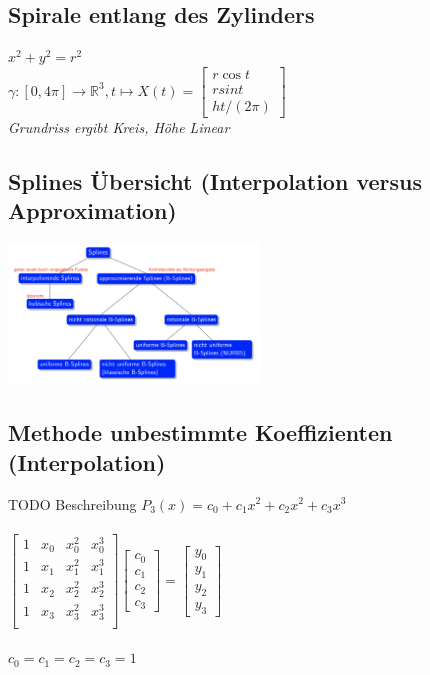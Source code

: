 \subsection{Spirale entlang des Zylinders}

$x^2 + y^2 = r^2$ \\
$\gamma : [0, 4\pi] \rightarrow \mathbb{R}^3, t \mapsto X(t) = \begin{bmatrix}
    r \cos t \\ r sin t \\ ht / (2\pi)
\end{bmatrix}$ \\
\textit{Grundriss ergibt Kreis, Höhe Linear}

\subsection{Splines Übersicht (Interpolation versus Approximation)}
\includegraphics[width=0.5\textwidth]{assets/InterpolationVSApproximation.png}


\subsection{Methode unbestimmte Koeffizienten (Interpolation)}
TODO Beschreibung
$P_3(x) = c_0 + c_1x^2 + c_2x^2 + c_3x^3$ \\
\\
$\begin{bmatrix}
    1 & x_0 & x_0^2 & x_0^3 \\
    1 & x_1 & x_1^2 & x_1^3 \\
    1 & x_2 & x_2^2 & x_2^3 \\
    1 & x_3 & x_3^2 & x_3^3 \\
\end{bmatrix} 
\begin{bmatrix}
    c_0 \\
    c_1 \\
    c_2 \\
    c_3
\end{bmatrix} = 
\begin{bmatrix}
    y_0 \\
    y_1 \\
    y_2 \\
    y_3
\end{bmatrix}$ \\
\\
\textit{$c_0 = c_1 = c_2 = c_3 = 1$}

